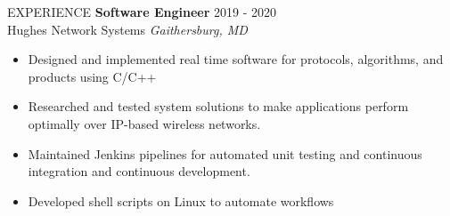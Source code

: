 \documentclass{resume} %
\begin{document}
\begin{rSection}{EXPERIENCE}
\textbf{Software Engineer} \hfill 2019 - 2020\\
Hughes Network Systems \hfill \textit{Gaithersburg, MD}
 \begin{itemize}
    \itemsep -4pt {} 
     \item Designed and implemented real time software for protocols, algorithms, and products using C/C++
    \item Researched and tested system solutions to make applications perform optimally over IP-based wireless networks.
    \item Maintained Jenkins pipelines for automated unit testing and continuous integration and continuous development.
    \item Developed shell scripts on Linux to automate workflows
 \end{itemize}


    

\end{rSection} 
\end{document}
